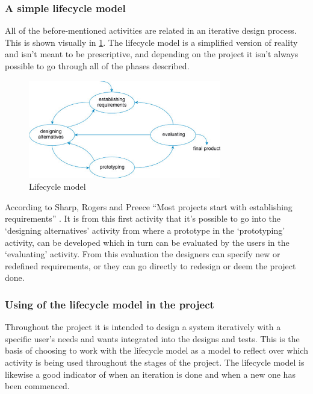\subsubsection{A simple lifecycle model}
All of the before-mentioned activities are related in an iterative design process. This is shown visually in \cref{fig:LifecycleModel}. The lifecycle model is a simplified version of reality and isn’t meant to be prescriptive, and depending on the project it isn’t always possible to go through all of the phases described. 

\begin{figure}[h]
	\centering
	\includegraphics[width=0.75\textwidth]{billeder/lifecycle.png}
	\caption{Lifecycle model \citep[p.~332]{InteractionDesign}}\label{fig:LifecycleModel}
\end{figure}

According to Sharp, Rogers and Preece “Most projects start with establishing requirements” \citep[p.~333]{InteractionDesign}. It is from this first activity that it’s possible to go into the ‘designing alternatives’ activity from where a prototype in the ‘prototyping’ activity, can be developed which in turn can be evaluated by the users in the ‘evaluating’ activity. From this evaluation the designers can specify new or redefined requirements, or they can go directly to redesign or deem the project done.


\subsubsection{Using of the lifecycle model in the project}
Throughout the project it is intended to design a system iteratively with a specific user’s needs and wants integrated into the designs and tests. This is the basis of choosing to work with the lifecycle model as a model to reflect over which activity is being used throughout the stages of the project. The lifecycle model is likewise a good indicator of when an iteration is done and when a new one has been commenced.




